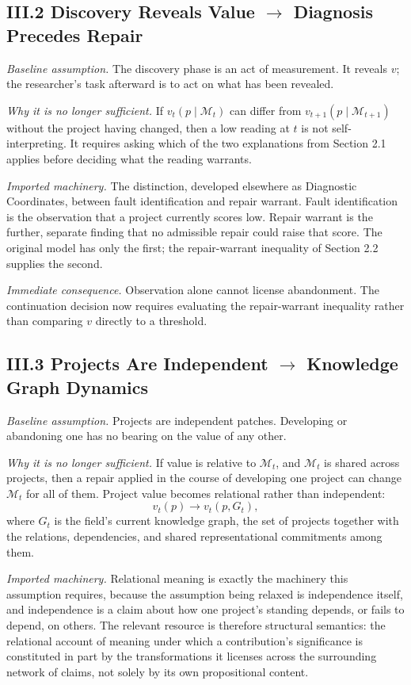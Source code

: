 \documentclass[11pt]{article}
\begin{document}
\subsection*{III.2 \quad Discovery Reveals Value $\rightarrow$ Diagnosis Precedes Repair}

\textit{Baseline assumption.} The discovery phase is an act of measurement. It reveals $v$; the researcher's task afterward is to act on what has been revealed.

\textit{Why it is no longer sufficient.} If $v_t(p \mid \mathcal{M}_t)$ can differ from $v_{t+1}(p \mid \mathcal{M}_{t+1})$ without the project having changed, then a low reading at $t$ is not self-interpreting. It requires asking which of the two explanations from Section 2.1 applies before deciding what the reading warrants.

\textit{Imported machinery.} The distinction, developed elsewhere as Diagnostic Coordinates, between fault identification and repair warrant. Fault identification is the observation that a project currently scores low. Repair warrant is the further, separate finding that no admissible repair could raise that score. The original model has only the first; the repair-warrant inequality of Section 2.2 supplies the second.

\textit{Immediate consequence.} Observation alone cannot license abandonment. The continuation decision now requires evaluating the repair-warrant inequality rather than comparing $v$ directly to a threshold.

\subsection*{III.3 \quad Projects Are Independent $\rightarrow$ Knowledge Graph Dynamics}

\textit{Baseline assumption.} Projects are independent patches. Developing or abandoning one has no bearing on the value of any other.

\textit{Why it is no longer sufficient.} If value is relative to $\mathcal{M}_t$, and $\mathcal{M}_t$ is shared across projects, then a repair applied in the course of developing one project can change $\mathcal{M}_t$ for all of them. Project value becomes relational rather than independent:
\[
v_t(p) \to v_t(p, G_t),
\]
where $G_t$ is the field's current knowledge graph, the set of projects together with the relations, dependencies, and shared representational commitments among them.

\textit{Imported machinery.} Relational meaning is exactly the machinery this assumption requires, because the assumption being relaxed is independence itself, and independence is a claim about how one project's standing depends, or fails to depend, on others. The relevant resource is therefore structural semantics: the relational account of meaning under which a contribution's significance is constituted in part by the transformations it licenses across the surrounding network of claims, not solely by its own propositional content.
\end{document}
